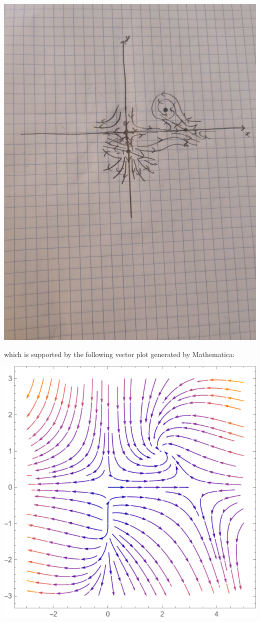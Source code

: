 \documentclass{article}
\begin{document}
\begin{itemize}
\begin{itemize}
\begin{center}
            \includegraphics[scale = 0.05]{prob2b_sketch.jpg}
        \end{center}
        which is supported by the following vector plot generated by Mathematica:
        \begin{center}
            \includegraphics[scale = 0.5]{prob2b_stream.png}
        \end{center}
        

\end{itemize}
\end{itemize}
\end{document}
